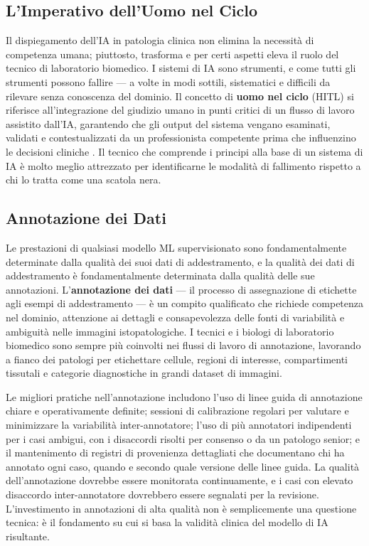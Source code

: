 \subsection{L'Imperativo dell'Uomo nel Ciclo}

Il dispiegamento dell'IA in patologia clinica non elimina la necessità di competenza umana; piuttosto, trasforma e per certi aspetti eleva il ruolo del tecnico di laboratorio biomedico. I sistemi di IA sono strumenti, e come tutti gli strumenti possono fallire — a volte in modi sottili, sistematici e difficili da rilevare senza conoscenza del dominio. Il concetto di \textbf{uomo nel ciclo} (HITL) si riferisce all'integrazione del giudizio umano in punti critici di un flusso di lavoro assistito dall'IA, garantendo che gli output del sistema vengano esaminati, validati e contestualizzati da un professionista competente prima che influenzino le decisioni cliniche \cite{bankhead2022}. Il tecnico che comprende i principi alla base di un sistema di IA è molto meglio attrezzato per identificarne le modalità di fallimento rispetto a chi lo tratta come una scatola nera.

\subsection{Annotazione dei Dati}

Le prestazioni di qualsiasi modello ML supervisionato sono fondamentalmente determinate dalla qualità dei suoi dati di addestramento, e la qualità dei dati di addestramento è fondamentalmente determinata dalla qualità delle sue annotazioni. L'\textbf{annotazione dei dati} — il processo di assegnazione di etichette agli esempi di addestramento — è un compito qualificato che richiede competenza nel dominio, attenzione ai dettagli e consapevolezza delle fonti di variabilità e ambiguità nelle immagini istopatologiche. I tecnici e i biologi di laboratorio biomedico sono sempre più coinvolti nei flussi di lavoro di annotazione, lavorando a fianco dei patologi per etichettare cellule, regioni di interesse, compartimenti tissutali e categorie diagnostiche in grandi dataset di immagini.

Le migliori pratiche nell'annotazione includono l'uso di linee guida di annotazione chiare e operativamente definite; sessioni di calibrazione regolari per valutare e minimizzare la variabilità inter-annotatore; l'uso di più annotatori indipendenti per i casi ambigui, con i disaccordi risolti per consenso o da un patologo senior; e il mantenimento di registri di provenienza dettagliati che documentano chi ha annotato ogni caso, quando e secondo quale versione delle linee guida. La qualità dell'annotazione dovrebbe essere monitorata continuamente, e i casi con elevato disaccordo inter-annotatore dovrebbero essere segnalati per la revisione. L'investimento in annotazioni di alta qualità non è semplicemente una questione tecnica: è il fondamento su cui si basa la validità clinica del modello di IA risultante.


